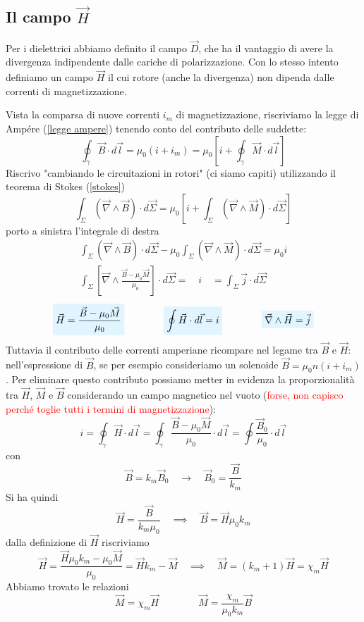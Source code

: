 \documentclass[x11names]{report}
\newcommand{\viola}[1]{%
	\colorbox{myblue}{$\displaystyle #1$}
}
\begin{document}
\subsection{Il campo \(\vec{H}\)}
Per i dielettrici abbiamo definito il campo \(\vec{D}\), che ha il vantaggio di avere la divergenza indipendente dalle cariche di polarizzazione. Con lo stesso intento definiamo un campo \(\vec{H}\) il cui rotore (anche la divergenza) non dipenda dalle correnti di magnetizzazione.

Vista la comparsa di nuove correnti \(i_m\) di magnetizzazione, riscriviamo la legge di Ampére (\ref{legge ampere}) tenendo conto del contributo delle suddette:
\[
\oint_\gamma \vec{B}\cdot d\vec{l} = \mu_0(i+i_m) = \mu_0\left[i + \oint_\gamma \vec{M}\cdot d\vec{l}\right]
\]
Riscrivo "cambiando le circuitazioni in rotori" (ci siamo capiti) utilizzando il teorema di Stokes (\ref{stokes}) 
\[
\int_\Sigma \left(\vec{\nabla}\wedge\vec{B}\right)\cdot d\vec{\Sigma}  =  \mu_0\left[i + \int_\Sigma\left(\vec{\nabla}\wedge\vec{M}\right)\cdot d\vec{\Sigma}\right]
\]
porto a sinistra l'integrale di destra 
\begin{gather*}
	\int_\Sigma \left(\vec{\nabla}\wedge\vec{B}\right)\cdot d\vec{\Sigma} - \mu_0\int_\Sigma\left(\vec{\nabla}\wedge\vec{M}\right)\cdot d\vec{\Sigma} = \mu_0 i \\
	\int_\Sigma \left[\vec{\nabla}\wedge \frac{\vec{B}-\mu_0\vec{M}}{\mu_0}\right] \cdot d\vec{\Sigma} = \quad i \quad = \int_\Sigma \vec{j} \cdot d\vec{\Sigma}
\end{gather*}
\begin{equation}
		\viola{\vec{H} = \frac{\vec{B}-\mu_0\vec{M}}{\mu_0}} \qquad \qquad \viola{\oint \vec{H} \cdot d\vec{l} = i} \qquad \qquad \viola{\vec{\nabla} \wedge \vec{H} = \vec{j}}
\end{equation}
Tuttavia il contributo delle correnti amperiane ricompare nel legame tra \(\vec{B}\) e \(\vec{H}\): nell'espressione di \(\vec{B}\), se per esempio consideriamo un solenoide \(\vec{B} = \mu_0n(i + i_m)\). Per eliminare questo contributo possiamo metter in evidenza la proporzionalità tra \(\vec{H}\), \(\vec{M}\) e \(\vec{B}\) considerando un campo magnetico nel vuoto (\textcolor{red}{forse, non capisco perché toglie tutti i termini di magnetizzazione}):
\[
i = \oint_\gamma \vec{H} \cdot d\vec{l} = \oint_\gamma \frac{\vec{B} - \mu_0 \vec{M}}{\mu_0} \cdot d\vec{l} = \oint \frac{\vec{B}_0}{\mu_0} \cdot d\vec{l}
\]
con 
\[
\vec{B} = k_m\vec{B}_0  \quad \to \quad \vec{B}_0 = \frac{\vec{B}}{k_m}
\]
Si ha quindi
\[
\vec{H} = \frac{\vec{B}}{k_m\mu_0} \quad \implies \quad \boxed{\vec{B} = \vec{H}\mu_0 k_m}
\]
dalla definizione di \(\vec{H}\) riscriviamo
\[
\vec{H} = \frac{\vec{H}\mu_0 k_m - \mu_0 \vec{M}}{\mu_0} = \vec{H} k_m - \vec{M} \quad \implies \quad \vec{M} = (k_m + 1)\vec{H} = \chi_m \vec{H}
\]
Abbiamo trovato le relazioni
\[
\boxed{\vec{M} = \chi_m \vec{H}} \qquad \qquad\boxed{\vec{M} = \frac{\chi_m}{\mu_0 k_m}\vec{B}}
\]
\end{document}
